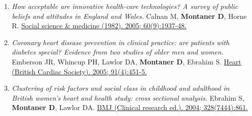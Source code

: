 \begin{enumerate}
{  molecular biology. 2006; 358(5):1390-404.}
\item
  \emph{How acceptable are innovative health-care technologies? A survey
  of public beliefs and attitudes in England and Wales.} Calnan M,
  \textbf{Montaner D}, Horne R.
  \href{http://www.ncbi.nlm.nih.gov//pubmed/15743645}{Social science \&
  medicine (1982). 2005; 60(9):1937-48.}
\item
  \emph{Coronary heart disease prevention in clinical practice: are
  patients with diabetes special? Evidence from two studies of older men
  and women.} Emberson JR, Whincup PH, Lawlor DA, \textbf{Montaner D},
  Ebrahim S. \href{http://www.ncbi.nlm.nih.gov//pubmed/15772196}{Heart
  (British Cardiac Society). 2005; 91(4):451-5.}
\item
  \emph{Clustering of risk factors and social class in childhood and
  adulthood in British women's heart and health study: cross sectional
  analysis.} Ebrahim S, \textbf{Montaner D}, Lawlor DA.
  \href{http://www.ncbi.nlm.nih.gov//pubmed/15006898}{BMJ (Clinical
  research ed.). 2004; 328(7444):861.}
\end{enumerate}

